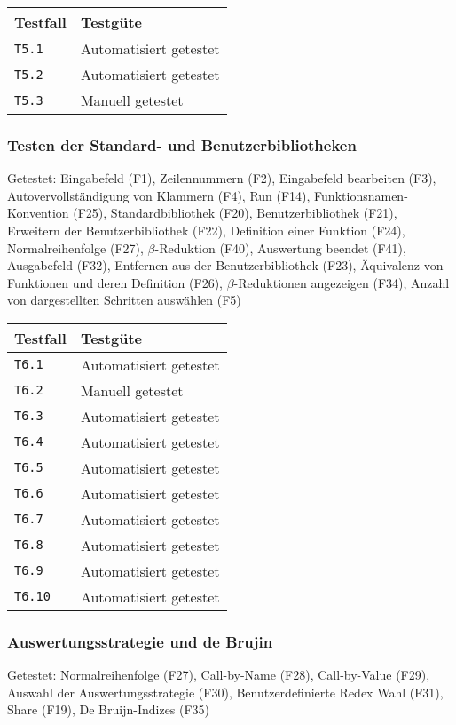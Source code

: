 \documentclass[parskip=full,11pt,twoside]{scrartcl}
\newcommand{\testline}[2]{
    \texttt{#1} & 
    \ifthenelse{\equal{#2}{Nicht getestet}}
        {\cellcolor{red!20}}
        {}
    \ifthenelse{\equal{#2}{Manuell getestet}}
        {\cellcolor{LimeGreen!20}}
        {}
    \ifthenelse{\equal{#2}{Automatisiert getestet}}
        {\cellcolor{green!20}}
        {}
    \ifthenelse{\equal{#2}{Nicht testbar}}
    {\cellcolor{gray!20}}
     {}
    #2 \\ \hline
}
\begin{document}
    \label{shortcuts}
    \begin{center}
        \begin{tabular}{ p{9cm} p{4cm}}
            Testfall & Testgüte \\ \hline
            \testline{T5.1}{Automatisiert getestet}
            \testline{T5.2}{Automatisiert getestet}
            \testline{T5.3}{Manuell getestet}
        \end{tabular}
    \end{center}

\subsubsection{Testen der Standard- und Benutzerbibliotheken}
    Getestet:
    Eingabefeld (F1),
    Zeilennummern (F2),
    Eingabefeld bearbeiten (F3),
    Autovervollständigung von Klammern (F4),
    Run (F14),
    Funktionsnamen-Konvention (F25),
    Standardbibliothek (F20),
    Benutzerbibliothek (F21),
    Erweitern der Benutzerbibliothek (F22),
    Definition einer Funktion (F24),
    Normalreihenfolge (F27),
    $\beta$-Reduktion (F40),
    Auswertung beendet (F41),
    Ausgabefeld (F32),
    Entfernen aus der Benutzerbibliothek (F23),
    Äquivalenz von Funktionen und deren Definition (F26),
    $\beta$-Reduktionen angezeigen (F34),
    Anzahl von dargestellten Schritten auswählen (F5)

    \label{shortcuts}
    \begin{center}
        \begin{tabular}{ p{9cm} p{4cm}}
            Testfall & Testgüte \\ \hline
            \testline{T6.1}{Automatisiert getestet}
            \testline{T6.2}{Manuell getestet}
            \testline{T6.3}{Automatisiert getestet}
            \testline{T6.4}{Automatisiert getestet}
            \testline{T6.5}{Automatisiert getestet}
            \testline{T6.6}{Automatisiert getestet}
            \testline{T6.7}{Automatisiert getestet}
            \testline{T6.8}{Automatisiert getestet}
            \testline{T6.9}{Automatisiert getestet}
            \testline{T6.10}{Automatisiert getestet}
        \end{tabular}
    \end{center}

\subsubsection{Auswertungsstrategie und de Brujin}
    Getestet:
    Normalreihenfolge (F27),
    Call-by-Name (F28),
    Call-by-Value (F29),
    Auswahl der Auswertungsstrategie (F30),
    Benutzerdefinierte Redex Wahl (F31),
    Share (F19),
    De Bruijn-Indizes (F35)
\end{document}

